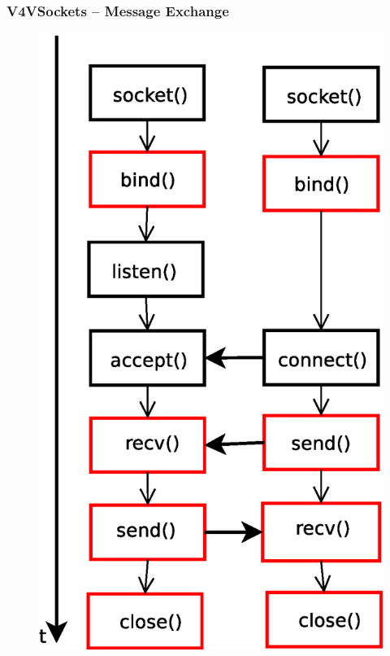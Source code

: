 \documentclass[red,slidestop,notes,compress,mathserif]{beamer}
\begin{document}
\begin{frame}
\frametitle{V4VSockets -- Message Exchange}
\begin{figure}
\includegraphics[scale=0.30]{figures/sockets.eps}
\end{figure}
\end{frame}
\end{document}
